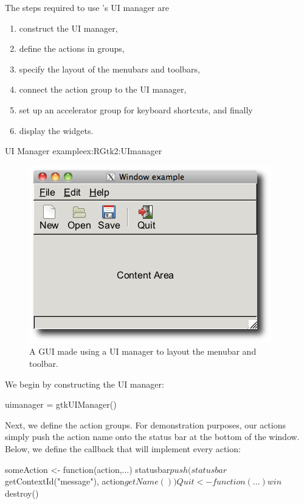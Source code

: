 The steps required to use \GTK's UI manager are
\begin{enumerate}
\item construct the UI manager,
\item define the actions in groups,
\item specify the layout of the menubars and toolbars,
\item connect the action group to the UI manager, 
\item set up an accelerator group for keyboard shortcuts, and finally
\item display the widgets.
\end{enumerate}

\begin{example}{UI Manager example}{ex:RGtk2:UImanager}

\begin{figure}
  \centering
  \includegraphics[width=.6\textwidth]{ex-RGtk2-UI}
  \caption{A GUI made using a UI manager to layout the menubar and toolbar.}
  \label{fig:RGtk2-UI}
\end{figure}


We begin by constructing the UI manager:
\begin{Schunk}
\begin{Sinput}
 uimanager = gtkUIManager()
\end{Sinput}
\end{Schunk}

Next, we define the action groups. For demonstration purposes, our
actions simply push the action name onto the status bar at the bottom
of the window. Below, we define the callback that will implement every
action:
\begin{Schunk}
\begin{Sinput}
 someAction <- function(action,...) 
   statusbar$push(statusbar$getContextId("message"), action$getName())
 Quit <- function(...) win$destroy()
\end{Sinput}
\end{Schunk}


\end{example}
